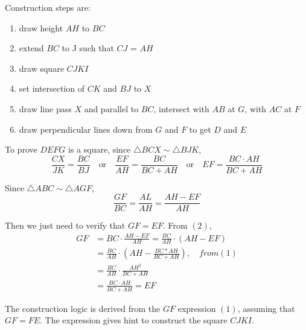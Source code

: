 \documentclass[12pt]{simple_doc}
\begin{document}
	Construction steps are:
	\begin{enumerate}[topsep=0pt,itemsep=-1ex,partopsep=1ex,parsep=1ex]
		\item draw height $AH$ to $BC$
		\item extend $BC$ to J such that $CJ$ = $AH$
		\item draw square $CJKI$
		\item set intersection of $CK$ and $BJ$ to $X$
		\item draw line pass $X$ and parallel to $BC$, intersect with $AB$ at $G$, with $AC$ at $F$
		\item draw perpendicular lines down from $G$ and $F$ to get $D$ and $E$
	\end{enumerate}\smallskip

	To prove $DEFG$ is a square, since $\triangle BCX \sim \triangle BJK$,
	\begin{equation}
		\frac{CX}{JK} = \frac{BC}{BJ}
		\quad \textrm{or} \quad \frac{EF}{AH} = \frac{BC}{BC + AH}
		\quad \textrm{or} \quad EF = \frac{BC \cdot AH}{BC + AH}
	\end{equation}

	Since $\triangle ABC \sim \triangle AGF$,
	\begin{equation}
		\frac{GF}{BC} = \frac{AL}{AH} = \frac{AH - EF}{AH}
	\end{equation}

	Then we just need to verify that $GF = EF$. From $(2)$,
	\begin{equation}
		\begin{aligned}
		GF &= BC \cdot \frac{AH - EF}{AH} = \frac{BC}{AH} \cdot (AH - EF)\\
		   &= \frac{BC}{AH} \cdot (AH - \frac{BC * AH}{BC + AH}), \quad from (1)\\
		   &= \frac{BC}{AH} \cdot \frac{AH^2}{BC + AH}\\
		   &= \frac{BC \cdot AH}{BC + AH} = EF
		\end{aligned}
	\end{equation}

	The construction logic is derived from the $GF$ expression $(1)$, assuming that $ GF = FE$.
	The expression gives hint to construct the square $CJKI$.
\end{document}
